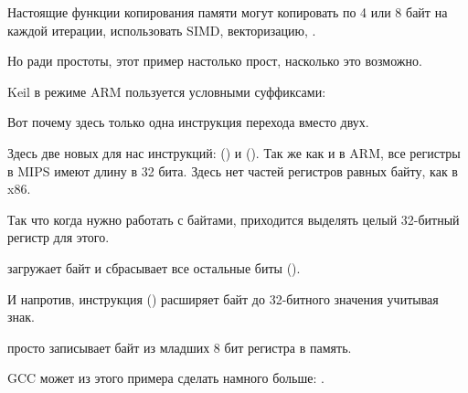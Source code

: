 ﻿
\label{loop_memcpy}

Настоящие функции копирования памяти могут копировать по 4 или 8 байт на каждой итерации, использовать \ac{SIMD},
векторизацию, \etc{}.

Но ради простоты, этот пример настолько прост, насколько это возможно.











Keil в режиме ARM пользуется условными суффиксами:



Вот почему здесь только одна инструкция перехода вместо двух.




Здесь две новых для нас инструкций:  () и  ().
Так же как и в ARM, все регистры в MIPS имеют длину в 32 бита. Здесь нет частей регистров равных байту,
как в x86.

Так что когда нужно работать с байтами, приходится выделять целый 32-битный регистр для этого.

 загружает байт и сбрасывает все остальные биты ().

И напротив, инструкция  () расширяет байт до 32-битного значения учитывая знак.

 просто записывает байт из младших 8 бит регистра в память.


\Optimizing GCC может из этого примера сделать намного больше: .
